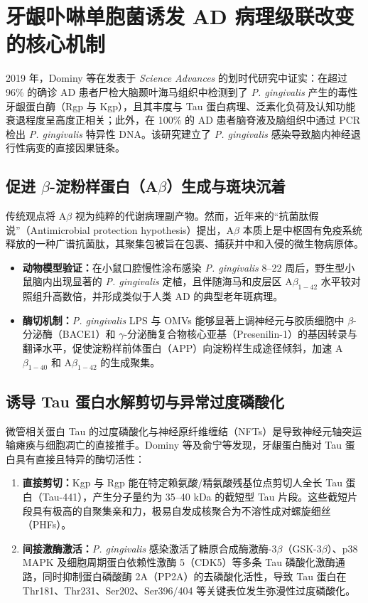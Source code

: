 \documentclass[12pt,a4paper]{ctexart}
\begin{document}
\section{牙龈卟啉单胞菌诱发 AD 病理级联改变的核心机制}

2019 年，Dominy 等\cite{dominy2019}在发表于 \textit{Science Advances} 的划时代研究中证实：在超过 96\% 的确诊 AD 患者尸检大脑颞叶海马组织中检测到了 \textit{P. gingivalis} 产生的毒性牙龈蛋白酶（Rgp 与 Kgp），且其丰度与 Tau 蛋白病理、泛素化负荷及认知功能衰退程度呈高度正相关；此外，在 100\% 的 AD 患者脑脊液及脑组织中通过 PCR 检出 \textit{P. gingivalis} 特异性 DNA。该研究建立了 \textit{P. gingivalis} 感染导致脑内神经退行性病变的直接因果链条。

\subsection{促进 $\beta$-淀粉样蛋白（A$\beta$）生成与斑块沉着}
传统观点将 A$\beta$ 视为纯粹的代谢病理副产物。然而，近年来的“抗菌肽假说”（Antimicrobial protection hypothesis）提出，A$\beta$ 本质上是中枢固有免疫系统释放的一种广谱抗菌肽，其聚集包被旨在包裹、捕获并中和入侵的微生物病原体\cite{dominy2019, ren2024}。
\begin{itemize}
    \item \textbf{动物模型验证：}在小鼠口腔慢性涂布感染 \textit{P. gingivalis} 8--22 周后，野生型小鼠脑内出现显著的 \textit{P. gingivalis} 定植，且伴随海马和皮层区 A$\beta_{1-42}$ 水平较对照组升高数倍，并形成类似于人类 AD 的典型老年斑病理\cite{ilievski2018, dominy2019}。
    \item \textbf{酶切机制：}\textit{P. gingivalis} LPS 与 OMVs 能够显著上调神经元与胶质细胞中 $\beta$-分泌酶（BACE1）和 $\gamma$-分泌酶复合物核心亚基（Presenilin-1）的基因转录与翻译水平，促使淀粉样前体蛋白（APP）向淀粉样生成途径倾斜，加速 A$\beta_{1-40}$ 和 A$\beta_{1-42}$ 的生成聚集\cite{ren2024}。
\end{itemize}

\subsection{诱导 Tau 蛋白水解剪切与异常过度磷酸化}
微管相关蛋白 Tau 的过度磷酸化与神经原纤维缠结（NFTs）是导致神经元轴突运输瘫痪与细胞凋亡的直接推手。Dominy 等\cite{dominy2019}及俞宁等\cite{yuning2018}发现，牙龈蛋白酶对 Tau 蛋白具有直接且特异的酶切活性：
\begin{enumerate}
    \item \textbf{直接剪切：}Kgp 与 Rgp 能在特定赖氨酸/精氨酸残基位点剪切人全长 Tau 蛋白（Tau-441），产生分子量约为 35--40 kDa 的截短型 Tau 片段。这些截短片段具有极高的自聚集亲和力，极易自发成核聚合为不溶性成对螺旋细丝（PHFs）\cite{dominy2019}。
    \item \textbf{间接激酶激活：}\textit{P. gingivalis} 感染激活了糖原合成酶激酶-3$\beta$（GSK-3$\beta$）、p38 MAPK 及细胞周期蛋白依赖性激酶 5（CDK5）等多条 Tau 磷酸化激酶通路，同时抑制蛋白磷酸酶 2A（PP2A）的去磷酸化活性，导致 Tau 蛋白在 Thr181、Thr231、Ser202、Ser396/404 等关键表位发生弥漫性过度磷酸化\cite{ren2024, yuning2018}。
\end{enumerate}
\end{document}
